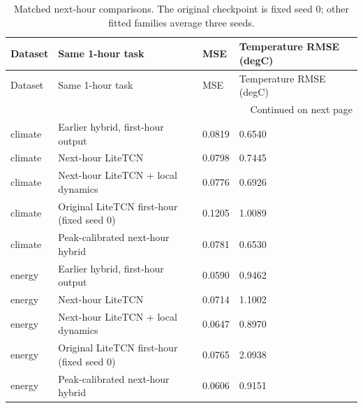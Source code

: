 {\footnotesize
\setlength{\tabcolsep}{3pt}
\renewcommand{\arraystretch}{1.17}
\begin{longtable}{@{}p{}p{}p{}p{}@{}}
\caption{Matched next-hour comparisons. The original checkpoint is fixed seed 0; other fitted families average three seeds.}\label{tab:rolling_comparison}\\
\toprule
Dataset & Same 1-hour task & MSE & Temperature RMSE (degC) \\
\midrule\endfirsthead
Dataset & Same 1-hour task & MSE & Temperature RMSE (degC) \\
\midrule\endhead
\midrule\multicolumn{4}{r}{Continued on next page}\\\endfoot
\bottomrule\endlastfoot
climate & Earlier hybrid, first-hour output & 0.0819 & 0.6540 \\
climate & Next-hour LiteTCN & 0.0798 & 0.7445 \\
climate & Next-hour LiteTCN + local dynamics & 0.0776 & 0.6926 \\
climate & Original LiteTCN first-hour (fixed seed 0) & 0.1205 & 1.0089 \\
climate & Peak-calibrated next-hour hybrid & 0.0781 & 0.6530 \\
energy & Earlier hybrid, first-hour output & 0.0590 & 0.9462 \\
energy & Next-hour LiteTCN & 0.0714 & 1.1002 \\
energy & Next-hour LiteTCN + local dynamics & 0.0647 & 0.8970 \\
energy & Original LiteTCN first-hour (fixed seed 0) & 0.0765 & 2.0938 \\
energy & Peak-calibrated next-hour hybrid & 0.0606 & 0.9151 \\
\end{longtable}
}
